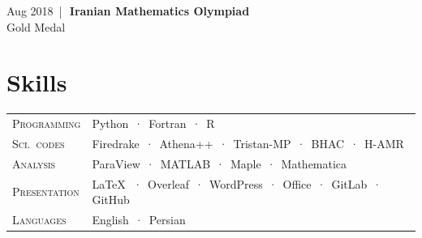 \documentclass[a4paper,10pt]{article}
\newcommand{\cvdate}[1]{\textcolor{muted}{\small #1}}
\newcommand{\pipe}{\textcolor{muted}{\,|\,}}
\begin{document}
\vspace{6pt}
\cvdate{Aug 2018} \pipe\ \textbf{Iranian Mathematics Olympiad}\\[1pt]
{\small Gold Medal}

\section*{Skills}

\begin{tabular}{@{}ll}
  \textsc{Programming}  & Python \,·\, Fortran \,·\, R \\[3pt]
  \textsc{Sci.\ codes}  & Firedrake \,·\, Athena++ \,·\, Tristan-MP \,·\, BHAC \,·\, H-AMR \\[3pt]
  \textsc{Analysis}     & ParaView \,·\, MATLAB \,·\, Maple \,·\, Mathematica \\[3pt]
  \textsc{Presentation} & \LaTeX\ \,·\, Overleaf \,·\, WordPress \,·\, Office \,·\, GitLab \,·\, GitHub \\[3pt]
  \textsc{Languages}    & English \,·\, Persian \\
\end{tabular}
\end{document}
